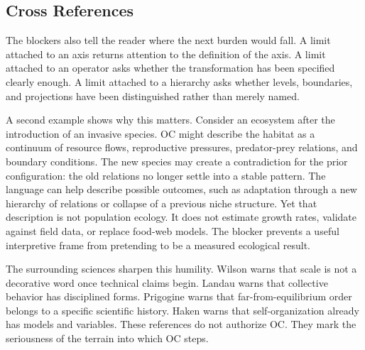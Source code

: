 \documentclass[11pt,a4paper,openany]{book}
\begin{document}
\subsection{Cross References}
The blockers also tell the reader where the next burden would fall. A limit attached to an axis returns attention to the definition of the axis. A limit attached to an operator asks whether the transformation has been specified clearly enough. A limit attached to a hierarchy asks whether levels, boundaries, and projections have been distinguished rather than merely named. \cite{wilson_renormalization,landau_stat_physics}\par
A second example shows why this matters. Consider an ecosystem after the introduction of an invasive species. OC might describe the habitat as a continuum of resource flows, reproductive pressures, predator-prey relations, and boundary conditions. The new species may create a contradiction for the prior configuration: the old relations no longer settle into a stable pattern. The language can help describe possible outcomes, such as adaptation through a new hierarchy of relations or collapse of a previous niche structure. Yet that description is not population ecology. It does not estimate growth rates, validate against field data, or replace food-web models. The blocker prevents a useful interpretive frame from pretending to be a measured ecological result.\par
The surrounding sciences sharpen this humility. Wilson warns that scale is not a decorative word once technical claims begin. Landau warns that collective behavior has disciplined forms. Prigogine warns that far-from-equilibrium order belongs to a specific scientific history. Haken warns that self-organization already has models and variables. These references do not authorize OC. They mark the seriousness of the terrain into which OC steps.\par
\end{document}
